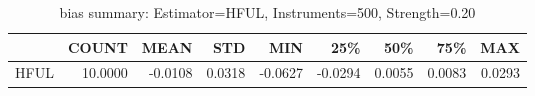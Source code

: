 \begin{table}[ht]
\centering
\caption{bias summary: Estimator=HFUL, Instruments=500, Strength=0.20}
\begin{tabular}{lrrrrrrrr}
\toprule
 & COUNT & MEAN & STD & MIN & 25\% & 50\% & 75\% & MAX \\
\midrule
HFUL & 10.0000 & -0.0108 & 0.0318 & -0.0627 & -0.0294 & 0.0055 & 0.0083 & 0.0293 \\
\bottomrule
\end{tabular}
\end{table}
